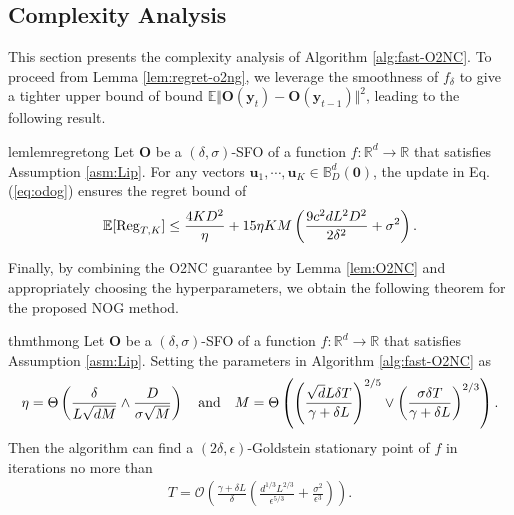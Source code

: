 \documentclass{article}
\def\vzero{{\bm{0}}}
\def\vu{{\bm{u}}}
\def\vy{{\bm{y}}}
\def\mO{{\bm{O}}}
\def\gO{{\mathcal{O}}}
\def\sB{{\mathbb{B}}}
\def\sR{{\mathbb{R}}}
\newcommand{\E}{\mathbb{E}}
\theoremstyle{definition}
\theoremstyle{remark}
\begin{document}
	
	\subsection{Complexity Analysis} \label{subsec:complexity-analysis}
	
	This section presents the complexity analysis of Algorithm \ref{alg:fast-O2NC}. To proceed from Lemma \ref{lem:regret-o2ng}, we leverage the smoothness of $f_\delta$ to give a tighter upper bound of
	bound $\E \Vert \mO(\vy_t) - \mO(\vy_{t-1}) \Vert^2$, leading to the following result.
	
	\begin{restatable}{lem}{lemregretong} \label{lem:regret-o2ng}
		Let $\mO$ be a $(\delta,\sigma)$-SFO of a function $f:\sR^d \rightarrow \sR$ that satisfies Assumption \ref{asm:Lip}.
		For any vectors $\vu_1,\cdots,\vu_K \in \sB_D^d(\vzero)$,
		the update in Eq. (\ref{eq:odog}) ensures the regret bound of
		\begin{align*}
			\E[{\rm Reg}_{T,K}] \le \frac{4 K D^2}{\eta} + 15 \eta KM \left( \frac{9 c^2 d L^2 D^2}{2 \delta^2} + \sigma^2 \right).
		\end{align*}
	\end{restatable}
	
	Finally, by combining the O2NC guarantee by Lemma \ref{lem:O2NC} and appropriately choosing the hyperparameters, we obtain the following theorem for the proposed NOG method.
	
	\begin{restatable}{thm}{thmong} \label{thm:o2ng}
		Let $\mO$ be a $(\delta,\sigma)$-SFO of a function $f:\sR^d \rightarrow \sR$ that satisfies Assumption \ref{asm:Lip}. Setting the parameters in Algorithm \ref{alg:fast-O2NC} as
		\begin{align*}
			\eta = \Theta \left( \frac{\delta}{L\sqrt{d M}} \land \frac{D}{\sigma \sqrt{M}}  \right) \quad {\rm and} \quad M = \Theta \left( \left( 
			\frac{\sqrt{d} L \delta T}{\gamma + \delta L}
			\right)^{2/5} \lor \left( \frac{\sigma \delta T}{\gamma + \delta L} \right)^{2/3} \right).
		\end{align*}
		Then the algorithm can find a $(2\delta,\epsilon)$-Goldstein stationary point of $f$ in iterations no more than
		\begin{align*}
			T = \gO \left( \frac{\gamma + \delta L}{\delta}  \left( \frac{ d^{1/3} L^{2/3}}{\epsilon^{5/3}} + \frac{\sigma^2}{\epsilon^3} \right) \right).
		\end{align*}
	\end{restatable}
	
\end{document}
